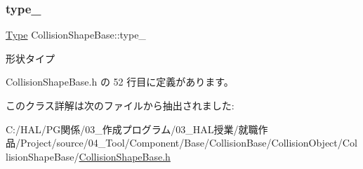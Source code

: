 \subsubsection{\texorpdfstring{type\+\_\+}{type\_}}
{\footnotesize\ttfamily \mbox{\hyperlink{class_collision_shape_base_a8abcef092855ad0ca191047044b002cb}{Type}} Collision\+Shape\+Base\+::type\+\_\+\hspace{0.3cm}{\ttfamily [private]}}



形状タイプ 



 Collision\+Shape\+Base.\+h の 52 行目に定義があります。



このクラス詳解は次のファイルから抽出されました\+:\begin{DoxyCompactItemize}
\item 
C\+:/\+H\+A\+L/\+P\+G関係/03\+\_\+作成プログラム/03\+\_\+\+H\+A\+L授業/就職作品/\+Project/source/04\+\_\+\+Tool/\+Component/\+Base/\+Collision\+Base/\+Collision\+Object/\+Collision\+Shape\+Base/\mbox{\hyperlink{_collision_shape_base_8h}{Collision\+Shape\+Base.\+h}}\end{DoxyCompactItemize}
